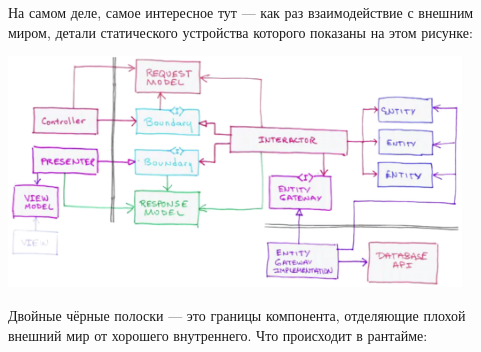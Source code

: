 \documentclass{../../text-style}
\begin{document}
На самом деле, самое интересное тут --- как раз взаимодействие с внешним миром, детали статического устройства которого показаны на этом рисунке:

\begin{center}
    \includegraphics[width=0.9\textwidth]{cleanArchitectureControlFlow.png}
\end{center}

Двойные чёрные полоски --- это границы компонента, отделяющие плохой внешний мир от хорошего внутреннего. Что происходит в рантайме:
\end{document}
